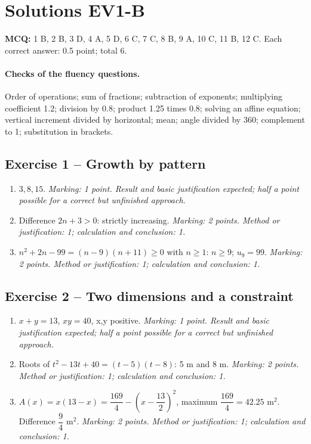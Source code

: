 \clearpage\section*{Solutions EV1-B}\label{EV1-B-CORR}
\textbf{MCQ:} 1 B, 2 B, 3 D, 4 A, 5 D, 6 C, 7 C, 8 B, 9 A, 10 C, 11 B, 12 C. Each correct answer: 0.5 point; total 6.
\paragraph{Checks of the fluency questions.} Order of operations; sum of fractions; subtraction of exponents; multiplying coefficient 1.2; division by 0.8; product 1.25 times 0.8; solving an affine equation; vertical increment divided by horizontal; mean; angle divided by 360; complement to 1; substitution in brackets.
\subsection*{Exercise 1 -- Growth by pattern}
\begin{enumerate}
\item $3,8,15$. \textit{Marking: 1 point. Result and basic justification expected; half a point possible for a correct but unfinished approach.}
\item Difference $2n+3>0$: strictly increasing. \textit{Marking: 2 points. Method or justification: 1; calculation and conclusion: 1.}
\item $n^2+2n-99=(n-9)(n+11)\geq0$ with $n\geq1$: $n\geq9$; $u_9=99$. \textit{Marking: 2 points. Method or justification: 1; calculation and conclusion: 1.}
\end{enumerate}
\subsection*{Exercise 2 -- Two dimensions and a constraint}
\begin{enumerate}
\item $x+y=13$, $xy=40$, x,y positive. \textit{Marking: 1 point. Result and basic justification expected; half a point possible for a correct but unfinished approach.}
\item Roots of $t^2-13t+40=(t-5)(t-8)$: 5 m and 8 m. \textit{Marking: 2 points. Method or justification: 1; calculation and conclusion: 1.}
\item $A(x)=x(13-x)=\dfrac{169}{4}-(x-\dfrac{13}{2})^2$, maximum $\dfrac{169}{4}=42.25$ m$^2$. Difference $\dfrac{9}{4}$ m$^2$. \textit{Marking: 2 points. Method or justification: 1; calculation and conclusion: 1.}
\end{enumerate}
